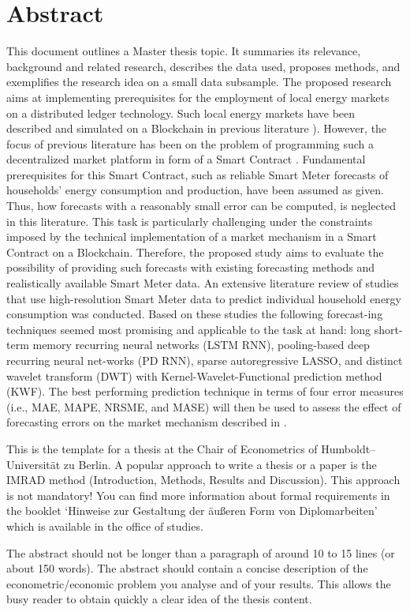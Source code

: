 \section*{Abstract}
This document outlines a Master thesis topic. It summaries its relevance, background and related research, describes the data used, proposes methods, and exemplifies the research idea on a small data subsample.
The proposed research aims at implementing prerequisites for the employment of local energy markets on a distributed ledger technology. Such local energy markets have been described and simulated on a Blockchain in previous literature \cite[e.g.,][]{Mengelkamp:2018a}). However, the focus of previous literature has been on the problem of programming such a decentralized market platform in form of a Smart Contract . Fundamental prerequisites for this Smart Contract, such as reliable Smart Meter forecasts of households’ energy consumption and production, have been assumed as given. Thus, how forecasts with a reasonably small error can be computed, is neglected in this literature. This task is particularly challenging under the constraints imposed by the technical implementation of a market mechanism in a Smart Contract on a Blockchain.
Therefore, the proposed study aims to evaluate the possibility of providing such forecasts with existing forecasting methods and realistically available Smart Meter data. An extensive literature review of studies that use high-resolution Smart Meter data to predict individual household energy consumption was conducted. Based on these studies the following forecast-ing techniques seemed most promising and applicable to the task at hand: long short-term memory recurring neural networks (LSTM RNN), pooling-based deep recurring neural net-works (PD RNN), sparse autoregressive LASSO, and distinct wavelet transform (DWT) with Kernel-Wavelet-Functional prediction method (KWF). The best performing prediction technique in terms of four error measures (i.e., MAE, MAPE, NRSME, and MASE) will then be used to assess the effect of forecasting errors on the market mechanism described in \citet{Mengelkamp:2018a}.

This is the template for a thesis at the Chair of Econometrics of
Humboldt--Universit\"at zu Berlin. A popular approach to write a
thesis or a paper is the IMRAD method (Introduction, Methods,
Results and Discussion). This approach is not mandatory! You can
find more information about formal requirements in the booklet
`Hinweise zur Gestaltung der \"au\ss eren Form von Diplomarbeiten' which is available in the office of studies.

The abstract should not be longer than a paragraph of around 10 to 15 lines (or about 150 words). The abstract should contain a
concise description of the econometric/economic problem you
analyse and of your results. This allows the busy reader to obtain quickly a clear idea of the thesis content.
